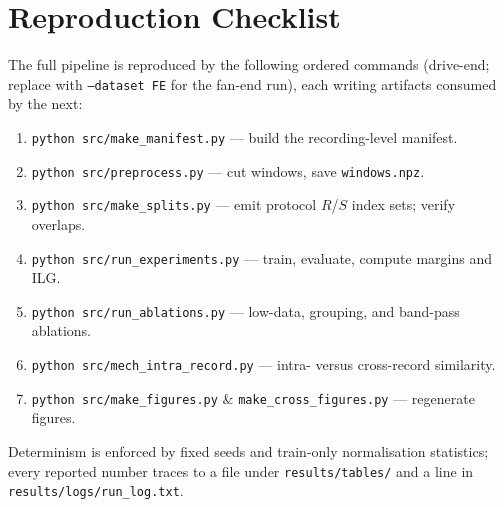 \documentclass[11pt]{article}
\begin{document}
\section{Reproduction Checklist}
\label{app:repro}
The full pipeline is reproduced by the following ordered commands (drive-end; replace with
\texttt{--dataset FE} for the fan-end run), each writing artifacts consumed by the next:
\begin{enumerate}
  \item \texttt{python src/make\_manifest.py} --- build the recording-level manifest.
  \item \texttt{python src/preprocess.py} --- cut windows, save \texttt{windows.npz}.
  \item \texttt{python src/make\_splits.py} --- emit protocol $R$/$S$ index sets; verify overlaps.
  \item \texttt{python src/run\_experiments.py} --- train, evaluate, compute margins and ILG.
  \item \texttt{python src/run\_ablations.py} --- low-data, grouping, and band-pass ablations.
  \item \texttt{python src/mech\_intra\_record.py} --- intra- versus cross-record similarity.
  \item \texttt{python src/make\_figures.py} \& \texttt{make\_cross\_figures.py} --- regenerate figures.
\end{enumerate}
Determinism is enforced by fixed seeds and train-only normalisation statistics; every
reported number traces to a file under \texttt{results/tables/} and a line in
\texttt{results/logs/run\_log.txt}.



\end{document}
